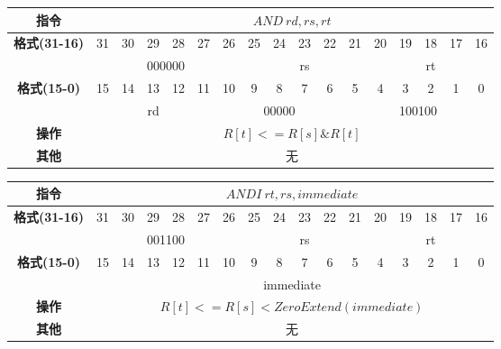 \documentclass[11pt,utf8]{article}
\begin{document}
\begin{center}
\begin{tabular}{|c|c|c|c|c|c|c|c|c|c|c|c|c|c|c|c|c|}
\hline
\textbf{指令} & \multicolumn{16}{c|}{$AND~rd, rs, rt$} \\
\hline
\multirow{2}{*}{\textbf{格式(31-16)}} & 31 & 30 & 29 & 28 & 27 & 26 & 25 & 24 & 23 & 22 & 21 & 20 & 19 & 18 & 17 & 16 \\ 
\cline{2-17}
& \multicolumn{6}{c|}{000000} & \multicolumn{5}{c|}{rs} & \multicolumn{5}{c|}{rt}\\
\hline
\multirow{2}{*}{\textbf{格式(15-0)}} & 15 & 14 & 13 & 12 & 11 & 10 & 9 & 8 & 7 & 6 & 5 & 4 & 3 & 2 & 1 & 0 \\
\cline{2-17}
& \multicolumn{5}{c|}{rd} & \multicolumn{5}{c|}{00000} & \multicolumn{6}{c|}{100100}\\
\hline
\textbf{操作} & \multicolumn{16}{c|}{$R[t]<=R[s] \& R[t]$} \\
\hline
\textbf{其他} & \multicolumn{16}{c|}{无} \\
\hline
\end{tabular}
\end{center}

\begin{center}
\begin{tabular}{|c|c|c|c|c|c|c|c|c|c|c|c|c|c|c|c|c|}
\hline
\textbf{指令} & \multicolumn{16}{c|}{$ANDI~rt,rs,immediate$} \\
\hline
\multirow{2}{*}{\textbf{格式(31-16)}} & 31 & 30 & 29 & 28 & 27 & 26 & 25 & 24 & 23 & 22 & 21 & 20 & 19 & 18 & 17 & 16 \\ 
\cline{2-17}
& \multicolumn{6}{c|}{001100} & \multicolumn{5}{c|}{rs} & \multicolumn{5}{c|}{rt}\\
\hline
\multirow{2}{*}{\textbf{格式(15-0)}} & 15 & 14 & 13 & 12 & 11 & 10 & 9 & 8 & 7 & 6 & 5 & 4 & 3 & 2 & 1 & 0 \\
\cline{2-17}
& \multicolumn{16}{c|}{immediate} \\
\hline
\textbf{操作} & \multicolumn{16}{c|}{$R[t]<=R[s] < ZeroExtend(immediate)$} \\
\hline
\textbf{其他} & \multicolumn{16}{c|}{无} \\
\hline
\end{tabular}
\end{center}
\end{document}
